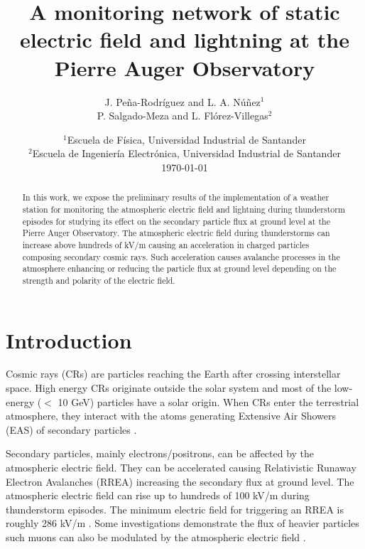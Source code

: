 \documentclass[letterpaper,12pt]{article}
\begin{document}
\title{\textbf{A monitoring network of static electric field and lightning at the Pierre Auger Observatory}}
\author{J. Peña-Rodríguez and L. A. Núñez$^1$ \\
P. Salgado-Meza and L. Flórez-Villegas$^2$}


\date{$^1$\small Escuela de Física, Universidad Industrial de Santander\\%
    $^2$Escuela de Ingeniería Electrónica, Universidad Industrial de Santander\\[2ex]%
\today}
\maketitle

\begin{abstract}
In this work, we expose the preliminary results of the implementation of a weather station for monitoring the atmospheric electric field and lightning during thunderstorm episodes for studying its effect on the secondary particle flux at ground level at the Pierre Auger Observatory. The atmospheric electric field during thunderstorms can increase above hundreds of kV/m causing an acceleration in charged particles composing secondary cosmic rays. Such acceleration causes avalanche processes in the atmosphere enhancing or reducing the particle flux at ground level depending on the strength and polarity of the electric field.
\end{abstract}

\section{Introduction}

Cosmic rays (CRs) are particles reaching the Earth after crossing interstellar space. High energy CRs originate outside the solar system and most of the low-energy ($<$ 10 GeV) particles have a solar origin. When CRs enter the terrestrial atmosphere, they interact with the atoms generating Extensive Air Showers (EAS) of secondary particles \cite{Spurio2015}.

Secondary particles, mainly electrons/positrons, can be affected by the atmospheric electric field. They can be accelerated \cite{marshall2005observed} causing Relativistic Runaway Electron Avalanches (RREA) \cite{dwyer2011low} increasing the secondary flux at ground level. The atmospheric electric field can rise up to hundreds of 100 kV/m during thunderstorm episodes. The minimum electric field for triggering an RREA is roughly 286 kV/m \cite{Skeltved2017, colalillo2019}. Some investigations demonstrate the flux of heavier particles such muons can also be modulated by the atmospheric electric field \cite{wang2012effect, alexeenko2002transient}.
\end{document}

